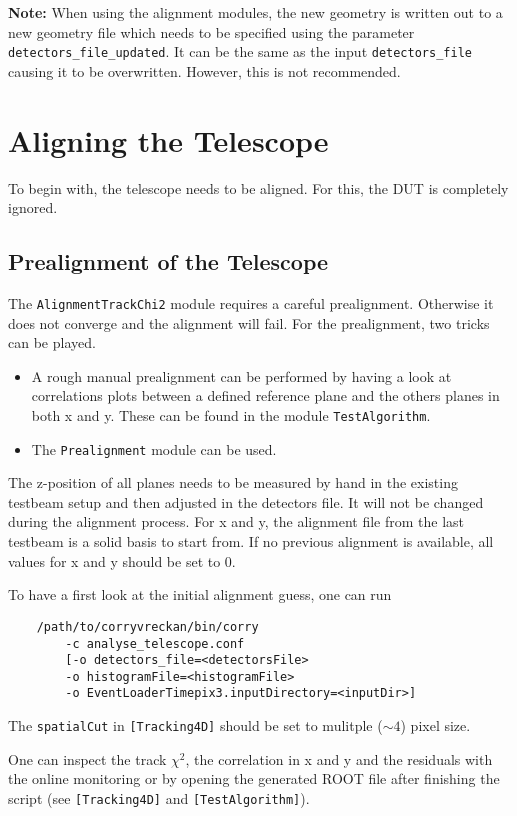 \textbf{Note:} When using the alignment modules, the new geometry is written out to a new geometry file which needs to be specified using the parameter \texttt{detectors\_file\_updated}.
It can be the same as the input \texttt{detectors\_file} causing it to be overwritten.
However, this is not recommended.

\section{Aligning the Telescope}
\label{sec:align_tel}
To begin with, the telescope needs to be aligned. 
For this, the DUT is completely ignored.

\subsection*{Prealignment of the Telescope}
The \texttt{AlignmentTrackChi2} module requires a careful prealignment. Otherwise it does not converge and the alignment will fail.
For the prealignment, two tricks can be played.
\begin{itemize}
\item A rough manual prealignment can be performed by having a look at correlations plots between a defined reference plane and the others planes in both x and y.
These can be found in the module \texttt{TestAlgorithm}.
\item The \texttt{Prealignment} module can be used.
\end{itemize}

The z-position of all planes needs to be measured by hand in the existing testbeam setup and then adjusted in the detectors file. 
It will not be changed during the alignment process.
For x and y, the alignment file from the last testbeam is a solid basis to start from.
If no previous alignment is available, all values for x and y should be set to 0.

To have a first look at the initial alignment guess, one can run
\begin{verbatim}
    /path/to/corryvreckan/bin/corry 
        -c analyse_telescope.conf
    	[-o detectors_file=<detectorsFile> 
    	-o histogramFile=<histogramFile> 
    	-o EventLoaderTimepix3.inputDirectory=<inputDir>]
\end{verbatim}

The \texttt{spatialCut} in \texttt{[Tracking4D]} should be set to mulitple ($\sim4$) pixel size.

One can inspect the track $\chi^2$, the correlation in x and y and the residuals with the online monitoring or by opening the generated ROOT file after finishing the script (see \texttt{[Tracking4D]} and \texttt{[TestAlgorithm]}).

